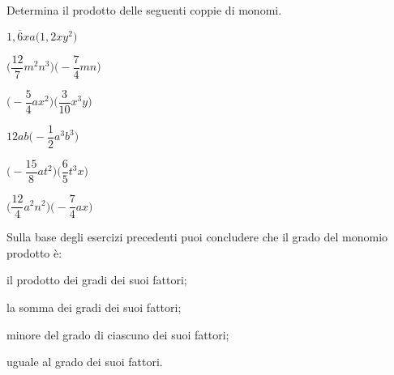 \begin{esercizio}
 \label{ese:9.15}
Determina il prodotto delle seguenti coppie di monomi.
\begin{multicols}{3}
\begin{enumeratea}
 \item \(1,\overline{6}xa\big(1,2xy^{2}\big)\)
 \item \(\bigg(\dfrac{12}{7}m^{2}n^{3}\bigg)\bigg(-{\dfrac{7}{4}}mn\bigg)\)
 \item \(\bigg(-{\dfrac{5}{4}}ax^{2}\bigg)\bigg(\dfrac{3}{10}x^{3}y\bigg)\)
 \item \(12ab\bigg(-{\dfrac{1}{2}}a^{3}b^{3}\bigg)\)
 \item \(\bigg(-{\dfrac{15}{8}}at^{2}\bigg)\bigg(\dfrac{6}{5}t^{3}x\bigg)\)
 \item \(\bigg(\dfrac{12}{4}a^{2}n^{2}\bigg)\bigg(-{\dfrac{7}{4}}ax\bigg)\)
\end{enumeratea}
\end{multicols}
\end{esercizio}


\begin{esercizio}
 \label{ese:9.16}
Sulla base degli esercizi precedenti puoi concludere che il grado del monomio 
prodotto è:

\begin{enumeratea}
 \item il prodotto dei gradi dei suoi fattori;
 \item la somma dei gradi dei suoi fattori;
 \item minore del grado di ciascuno dei suoi fattori;
 \item uguale al grado dei suoi fattori.
\end{enumeratea}
\end{esercizio}

\subsubsection*{}


